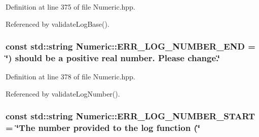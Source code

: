\-Definition at line 375 of file \-Numeric.\-hpp.



\-Referenced by validate\-Log\-Base().

\hypertarget{classmultiscale_1_1Numeric_a2f61b82d42049e175a8d34cd75966c6c}{
\subsubsection[{\-E\-R\-R\-\_\-\-L\-O\-G\-\_\-\-N\-U\-M\-B\-E\-R\-\_\-\-E\-N\-D}]{\setlength{\rightskip}{0pt plus 5cm}const std\-::string {\bf \-Numeric\-::\-E\-R\-R\-\_\-\-L\-O\-G\-\_\-\-N\-U\-M\-B\-E\-R\-\_\-\-E\-N\-D} = \char`\"{}) should be a positive real number. \-Please change.\char`\"{}}}\label{classmultiscale_1_1Numeric_a2f61b82d42049e175a8d34cd75966c6c}


\-Definition at line 378 of file \-Numeric.\-hpp.



\-Referenced by validate\-Log\-Number().

\hypertarget{classmultiscale_1_1Numeric_a88ca9309ade745700dacbdc7c0d713f2}{
\subsubsection[{\-E\-R\-R\-\_\-\-L\-O\-G\-\_\-\-N\-U\-M\-B\-E\-R\-\_\-\-S\-T\-A\-R\-T}]{\setlength{\rightskip}{0pt plus 5cm}const std\-::string {\bf \-Numeric\-::\-E\-R\-R\-\_\-\-L\-O\-G\-\_\-\-N\-U\-M\-B\-E\-R\-\_\-\-S\-T\-A\-R\-T} = \char`\"{}\-The number provided to the {\bf log} function (\char`\"{}}}\label{classmultiscale_1_1Numeric_a88ca9309ade745700dacbdc7c0d713f2}


